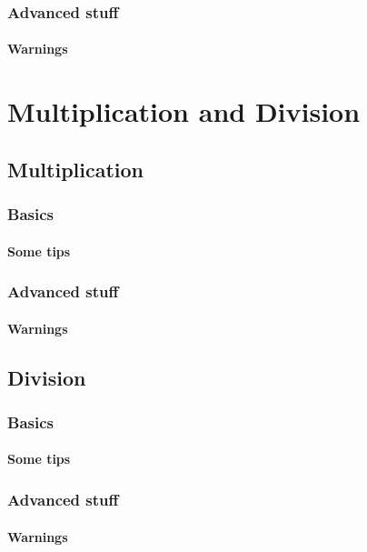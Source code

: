 \documentclass[11pt,a4paper]{report}
\theoremstyle{plain}
\theoremstyle{definition}
\theoremstyle{remark}
\begin{document}
	\section{Advanced stuff}
	\subsection{Warnings}
	
	\part{Multiplication and Division}
	
	\chapter{Multiplication}
	\section{Basics}
	\subsection{Some tips}
	\section{Advanced stuff}
	\subsection{Warnings}
	
	\chapter{Division}
	\section{Basics}
	\subsection{Some tips}
	\section{Advanced stuff}
	\subsection{Warnings}
	
	
	
\end{document}
